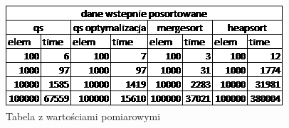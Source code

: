 \documentclass[a4paper,10pt]{scrartcl}
\begin{document}
\begin{landscape}
\pagebreak

\begin{figure}
 \centering
  \includegraphics[scale=1]{tab2}
 \caption{Tabela z wartościami pomiarowymi}
\end{figure}
\end{landscape}
\end{document}

